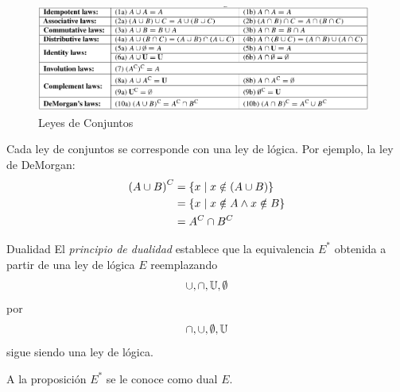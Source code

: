 \begin{figure}
	\centering
	\includegraphics[width=11cm,keepaspectratio=true]{./md/leyes_conjuntos.png}
	\caption{Leyes de Conjuntos}
	\label{fig:leyesconjuntos}
\end{figure}




Cada ley de conjuntos se corresponde con una ley de lógica. Por ejemplo, la ley de DeMorgan:
\begin{align*}
	\left(A \cup B\right)^{C} &= \left\{ x \mid x\notin(A \cup B) \right\}\\
	&= \left\{ x \mid x\notin A \wedge x\notin B \right\}\\
	&=A^{C}\cap B^{C}
\end{align*}



{Dualidad}
El \emph{principio de dualidad} establece que la equivalencia $E^{*}$ obtenida a partir de una ley de lógica $E$ reemplazando
\[ \cup, \cap, \mathbb{U}, \emptyset\] por
\[ \cap, \cup, \emptyset, \mathbb{U}\]
sigue siendo una ley de lógica.


A la proposición $E^{*}$ se le conoce como dual $E.$

